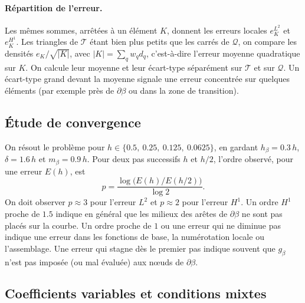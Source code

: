 \documentclass[11pt,a4paper]{article}
\begin{document}
\paragraph{Répartition de l'erreur.} Les mêmes sommes, arrêtées à un
élément $K$, donnent les erreurs locales $e_K^{L^2}$ et $e_K^{H^1}$. Les
triangles de $\mathcal{T}$ étant bien plus petits que les carrés de
$\mathcal{Q}$, on compare les densités
$e_K / \sqrt{|K|}$, avec $|K| = \sum_q w_q d_q$, c'est-à-dire l'erreur
moyenne quadratique sur $K$. On calcule leur moyenne et leur écart-type
séparément sur $\mathcal{T}$ et sur $\mathcal{Q}$. Un écart-type grand
devant la moyenne signale une erreur concentrée sur quelques éléments (par
exemple près de $\partial\beta$ ou dans la zone de transition).

\subsection{Étude de convergence}

On résout le problème pour $h \in \{0.5,\ 0.25,\ 0.125,\ 0.0625\}$, en
gardant $h_\beta = 0.3\,h$, $\delta = 1.6\,h$ et $m_\beta = 0.9\,h$. Pour deux
pas successifs $h$ et $h/2$, l'ordre observé, pour une erreur $E(h)$, est
\[
p = \frac{\log\big(E(h) / E(h/2)\big)}{\log 2} .
\]
On doit observer $p \approx 3$ pour l'erreur $L^2$ et $p \approx 2$ pour
l'erreur $H^1$. Un ordre $H^1$ proche de $1.5$ indique en général que les
milieux des arêtes de $\partial\beta$ ne sont pas placés sur la courbe. Un
ordre proche de $1$ ou une erreur qui ne diminue pas indique une erreur
dans les fonctions de base, la numérotation locale ou l'assemblage. Une
erreur qui stagne dès le premier pas indique souvent que $g_\beta$ n'est pas
imposée (ou mal évaluée) aux nœuds de $\partial\beta$.

\subsection{Coefficients variables et conditions mixtes}
\label{sec:validation-generale}
\end{document}
